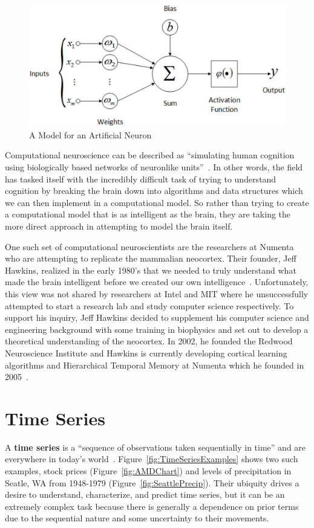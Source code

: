 \documentclass[oneside,12pt,openany]{book}
\begin{document}
	\begin{figure}[!ht]
		\centering
		\includegraphics[width=.8\linewidth]{images/ArtificialNeuron.jpg}
		\caption{A Model for an Artificial Neuron}
		\label{fig:ArtNeuron}
	\end{figure}
	
	Computational neuroscience can be described as ``simulating human cognition using biologically based networks of neuronlike units''~\cite{Eberhart}. In other words, the field has tasked itself with the incredibly difficult task of trying to understand cognition by breaking the brain down into algorithms and data structures which we can then implement in a computational model. So rather than trying to create a computational model that is as intelligent as the brain, they are taking the more direct approach in attempting to model the brain itself.
	
	One such set of computational neuroscientists are the researchers at Numenta who are attempting to replicate the mammalian neocortex. Their founder, Jeff Hawkins, realized in the early 1980's that we needed to truly understand what made the brain intelligent before we created our own intelligence~\cite{OnIntelligence}. Unfortunately, this view was not shared by  researchers at Intel and MIT where he unsuccessfully attempted to start a research lab and study computer science respectively. To support his inquiry, Jeff Hawkins decided to supplement his computer science and engineering background with some training in biophysics and set out to develop a theoretical understanding of the neocortex. In 2002, he founded the Redwood Neuroscience Institute and Hawkins is currently developing cortical learning algorithms and Hierarchical Temporal Memory at Numenta which he founded in 2005~\cite{OnIntelligence}. 
	
	\chapter{Time Series}
	
	A \textbf{time series} is a ``sequence of observations taken sequentially in time'' and are everywhere in today's world~\cite{Box}. Figure~\ref{fig:TimeSeriesExamples} shows two such examples, stock prices (Figure~\ref{fig:AMDChart}) and levels of precipitation in Seatle, WA from 1948-1979 (Figure~\ref{fig:SeattlePrecip}). Their ubiquity drives a desire to understand, characterize, and predict time series, but it can be an extremely complex task because there is generally a dependence on prior terms due to the sequential nature and some uncertainty to their movements.
	
\end{document}
